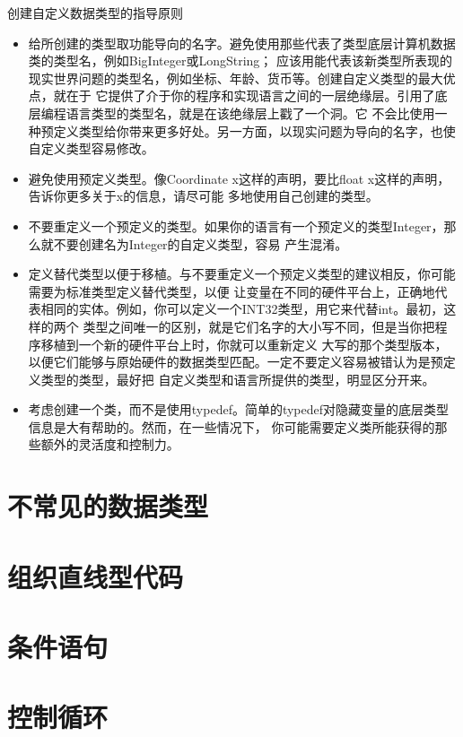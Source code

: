 \documentclass{article}
\begin{document}
\par
创建自定义数据类型的指导原则
\begin{itemize}
    \item 给所创建的类型取功能导向的名字。避免使用那些代表了类型底层计算机数据类的类型名，例如BigInteger或LongString；
    应该用能代表该新类型所表现的现实世界问题的类型名，例如坐标、年龄、货币等。创建自定义类型的最大优点，就在于
    它提供了介于你的程序和实现语言之间的一层绝缘层。引用了底层编程语言类型的类型名，就是在该绝缘层上戳了一个洞。它
    不会比使用一种预定义类型给你带来更多好处。另一方面，以现实问题为导向的名字，也使自定义类型容易修改。
    \item 避免使用预定义类型。像Coordinate x这样的声明，要比float x这样的声明，告诉你更多关于x的信息，请尽可能
    多地使用自己创建的类型。
    \item 不要重定义一个预定义的类型。如果你的语言有一个预定义的类型Integer，那么就不要创建名为Integer的自定义类型，容易
    产生混淆。
    \item 定义替代类型以便于移植。与不要重定义一个预定义类型的建议相反，你可能需要为标准类型定义替代类型，以便
    让变量在不同的硬件平台上，正确地代表相同的实体。例如，你可以定义一个INT32类型，用它来代替int。最初，这样的两个
    类型之间唯一的区别，就是它们名字的大小写不同，但是当你把程序移植到一个新的硬件平台上时，你就可以重新定义
    大写的那个类型版本，以便它们能够与原始硬件的数据类型匹配。一定不要定义容易被错认为是预定义类型的类型，最好把
    自定义类型和语言所提供的类型，明显区分开来。
    \item 考虑创建一个类，而不是使用typedef。简单的typedef对隐藏变量的底层类型信息是大有帮助的。然而，在一些情况下，
    你可能需要定义类所能获得的那些额外的灵活度和控制力。
\end{itemize}


\section{不常见的数据类型}

\section{组织直线型代码}

\section{条件语句}

\section{控制循环}
\end{document}
